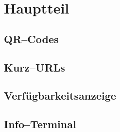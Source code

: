 \section{Hauptteil}
\label{sec:hauptteil}

\subsection{QR--Codes}
\subsection{Kurz--URLs}
\subsection{Verfügbarkeitsanzeige}
\subsection{Info--Terminal}

